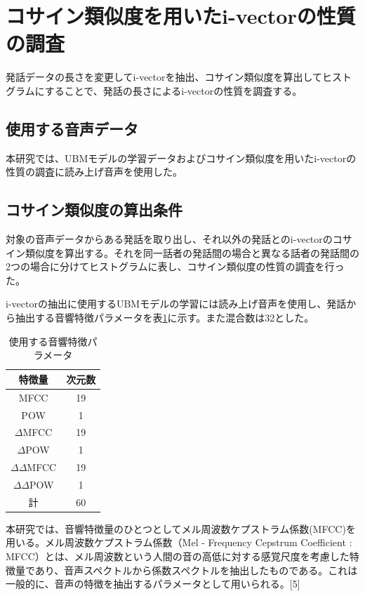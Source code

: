 \section{コサイン類似度を用いたi-vectorの性質の調査}
発話データの長さを変更してi-vectorを抽出、コサイン類似度を算出してヒストグラムにすることで、発話の長さによるi-vectorの性質を調査する。
\subsection{使用する音声データ}
本研究では、UBMモデルの学習データおよびコサイン類似度を用いたi-vectorの性質の調査に読み上げ音声\cite{ATR}を使用した。

\subsection{コサイン類似度の算出条件}
対象の音声データからある発話を取り出し、それ以外の発話とのi-vectorのコサイン類似度を算出する。それを同一話者の発話間の場合と異なる話者の発話間の2つの場合に分けてヒストグラムに表し、コサイン類似度の性質の調査を行った。\par
i-vectorの抽出に使用するUBMモデルの学習には読み上げ音声\cite{ATR}を使用し、発話から抽出する音響特徴パラメータを表\ref{iv_feature}に示す。また混合数は32とした。

\begin{table}[H]
  \begin{center}
    \caption{使用する音響特徴パラメータ}
    \label{iv_feature}
    \begin{tabular}{|c||c|} \hline
      特徴量 & 次元数\\ \hline
      MFCC & 19  \\ \hline
      POW & 1  \\ \hline
      $\Delta$MFCC & 19 \\ \hline
      $\Delta$POW & 1 \\ \hline
      $\Delta\Delta$MFCC & 19 \\ \hline
      $\Delta\Delta$POW & 1 \\ \hline
      計 & 60 \\ \hline
    \end{tabular}
  \end{center}
\end{table}

本研究では、音響特徴量のひとつとしてメル周波数ケプストラム係数(MFCC)を用いる。メル周波数ケプストラム係数（Mel - Frequency Cepstrum Coefficient : MFCC）とは、メル周波数という人間の音の高低に対する感覚尺度を考慮した特徴量であり、音声スペクトルから係数スペクトルを抽出したものである。これは一般的に、音声の特徴を抽出するパラメータとして用いられる。[5]

